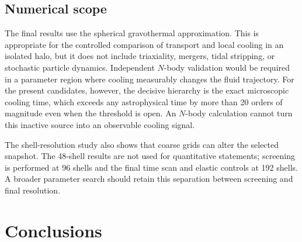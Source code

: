 \documentclass[12pt]{article}
\begin{document}
\subsection{Numerical scope}

The final results use the spherical gravothermal approximation.  This is
appropriate for the controlled comparison of transport and local cooling in
an isolated halo, but it does not include triaxiality, mergers, tidal stripping,
or stochastic particle dynamics.  Independent $N$-body validation would be
required in a parameter region where cooling measurably changes the fluid
trajectory.  For the present candidates, however, the decisive hierarchy is
the exact microscopic cooling time, which exceeds any astrophysical time by
more than 20 orders of magnitude even when the threshold is open.  An
$N$-body calculation cannot turn this inactive source into an observable
cooling signal.

The shell-resolution study also shows that coarse grids can alter the selected
snapshot.  The 48-shell results are not used for quantitative statements;
screening is performed at 96 shells and the final time scan and elastic
controls at 192 shells.  A broader parameter search should retain this
separation between screening and final resolution.

\section{Conclusions}
\label{sec:conclusions}
\end{document}
